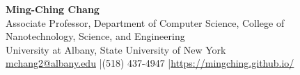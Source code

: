 \documentclass[10pt]{article}
\begin{document}
\begin{center}
  {\LARGE\bfseries Ming-Ching Chang}\\[-0.10em]
  \small Associate Professor, Department of Computer Science, College of Nanotechnology, Science, and Engineering\\
  University at Albany, State University of New York\\[-0.10em]
  \href{mailto:mchang2@albany.edu}{mchang2@albany.edu} \quad|\quad (518) 437-4947 \quad|\quad \url{https://mingching.github.io/}
\end{center}
\vspace{-0.55em}




\end{document}
